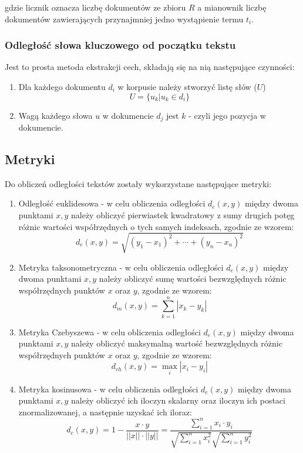 \documentclass{classrep}
\begin{document}
gdzie licznik oznacza liczbę dokumentów ze zbioru $ R $ a mianownik liczbę dokumentów
zawierających przynajmniej jedno wystąpienie termu $ t_{i} $.

\subsubsection{Odległość słowa kluczowego od początku tekstu}
Jest to prosta metoda ekstrakcji cech, składają się na nią następujące czynności:

\begin{enumerate}
  \item Dla każdego dokumentu $ d_{i} $ w korpusie należy stworzyć listę słów ($ U $)
    $$ U = \{ u_{k} | u_{k} \in d_{i} \} $$
  \item Wagą każdego słowa $ u $ w dokumencie $ d_{j} $ jest $ k $ - czyli jego pozycja w
    dokumencie.
\end{enumerate}

\subsection{Metryki}
Do obliczeń odległości tekstów zostały wykorzystane następujące metryki:

\begin{enumerate}
\item Odległość euklidesowa - w celu obliczenia odległości $ d_{e}(x,y) $ między dwoma punktami $ x, y $ należy obliczyć pierwiastek kwadratowy z sumy drugich potęg różnic wartości współrzędnych o tych samych indeksach, zgodnie ze wzorem:
$$
d_{e}(x,y)= \sqrt{ (y_{1} - x_{1})^2 + \cdots + (y_{n} - x_{n})^2 }
$$

\item Metryka taksonometryczna - w celu obliczenia odległości $ d_{e}(x,y) $ między dwoma punktami $ x, y $ należy obliczyć sumę wartości bezwzględnych różnic współrzędnych punktów $ x $ oraz $ y $, zgodnie ze wzorem:
$$
d_{m}(x,y)= \sum_{k=1}^{n} | x_{k} - y_{k} |
$$

\item Metryka Czebyszewa - w celu obliczenia odległości $ d_{e}(x,y) $ między dwoma punktami $ x, y $ należy obliczyć maksymalną wartość bezwzględnych różnic współrzędnych punktów $ x $ oraz $ y $, zgodnie ze wzorem:
$$
d_{ch}(x,y)= \max_{i} |x_{i} - y_{i}|
$$

\item Metryka kosinusowa - w celu obliczenia odległości $ d_{e}(x,y) $ między dwoma punktami $ x, y $ należy obliczyć ich iloczyn skalarny oraz iloczyn ich postaci znormalizowanej, a następnie uzyskać ich iloraz:
$$
d_{c}(x,y)= 1 - \frac{x \cdot y}{||x|| \cdot ||y||} = \frac{\sum_{i=1}^{n} x_{i} \cdot y_{i}}{\sqrt{\sum_{i=1}^{n} x_{i}^2}\sqrt{\sum_{i=1}^{n} y_{i}^2}}
$$

\end{enumerate}
\end{document}
